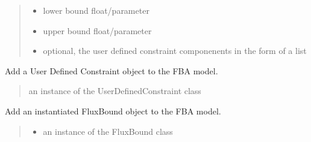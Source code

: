 \documentclass[letterpaper,12pt,english]{sphinxmanual}
\begin{document}
\begin{fulllineitems}
\begin{fulllineitems}
\begin{quote}
\begin{description}
\begin{itemize}
\item {} 
\sphinxAtStartPar
{} \textendash{} lower bound float/parameter

\item {} 
\sphinxAtStartPar
{} \textendash{} upper bound float/parameter

\item {} 
\sphinxAtStartPar
{} \textendash{} optional, the user defined constraint componenents in the form of a list

\end{itemize}

\end{description}\end{quote}

\end{fulllineitems}


\begin{fulllineitems}
\label{\detokenize{api/core:cbmpy.CBModel.Model.addUserDefinedConstraint}}
\pysigstartsignatures
\pysiglinewithargsret
{}
{}
{}
\pysigstopsignatures
\sphinxAtStartPar
Add a  User Defined Constraint object to the FBA model.
\begin{quote}\begin{description}
\sphinxAtStartPar
{} \textendash{} an instance of the UserDefinedConstraint class

\end{description}\end{quote}

\end{fulllineitems}


\begin{fulllineitems}
\label{\detokenize{api/core:cbmpy.CBModel.Model.addFluxBound}}
\pysigstartsignatures
\pysiglinewithargsret
{}
{\sphinxparamcomma {}}
{}
\pysigstopsignatures
\sphinxAtStartPar
Add an instantiated FluxBound object to the FBA model.
\begin{quote}\begin{description}
\begin{itemize}
\item {} 
\sphinxAtStartPar
{} \textendash{} an instance of the FluxBound class


\end{itemize}
\end{description}
\end{quote}
\end{fulllineitems}
\end{fulllineitems}
\end{document}
